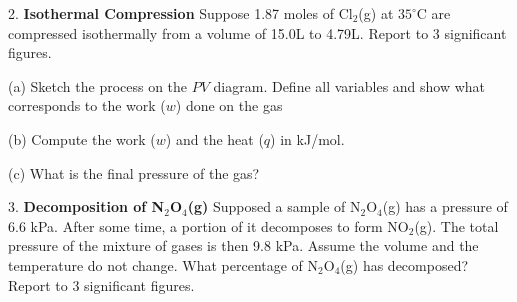 \documentclass[11pt]{article}
\begin{document}
2. \textbf{Isothermal Compression} Suppose 1.87 moles of Cl$_2$(g) at $35^\circ\text{C}$ are
compressed isothermally from a volume of 15.0L to 4.79L. Report to 3 significant figures.

(a) Sketch the process on the $PV$ diagram. Define all variables and show what corresponds
to the work ($w$) done on the gas

(b) Compute the work ($w$) and the heat ($q$) in kJ/mol.

(c) What is the final pressure of the gas?

3. \textbf{Decomposition of N$_2$O$_4$(g)} Supposed a sample of N$_2$O$_4$(g) has
a pressure of 6.6 kPa. After some time, a portion of it decomposes to form NO$_2$(g).
The total pressure of the mixture of gases is then 9.8 kPa. Assume the volume and the
temperature do not change. What percentage of N$_2$O$_4$(g) has decomposed? Report to
3 significant figures.

\pagebreak
\end{document}
